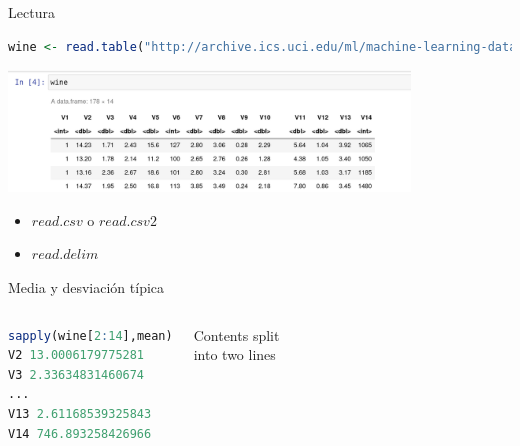 \documentclass[xcolor=table]{beamer}
\begin{document}
\begin{frame}[fragile]{Lectura}



\begin{lstlisting}[language=R, basicstyle=\ttfamily]
wine <- read.table("http://archive.ics.uci.edu/ml/machine-learning-databases/wine/wine.data",sep=",")
\end{lstlisting}
\centering
\includegraphics[width=0.8\textwidth]{dataframe_wine.png}

\begin{itemize}
\item $read.csv$ o $read.csv2$
\item $read.delim$
\end{itemize}
\end{frame}



\begin{frame}[fragile]{Media y desviación típica}
    \begin{columns}[c] %
     \begin{lstlisting}[language=R, basicstyle=\ttfamily]
sapply(wine[2:14],mean)
V2 13.0006179775281
V3 2.33634831460674
...
V13 2.61168539325843
V14 746.893258426966 
\end{lstlisting}
     Contents split \\ into two lines
    \end{columns}
\end{frame}
\end{document}
